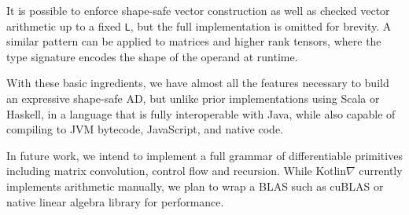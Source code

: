 \documentclass{article}
\newcommand{\squeezeup}{\vspace{-2.5mm}}
\begin{document}
    It is possible to enforce shape-safe vector construction as well as checked vector arithmetic up to a fixed \texttt{L}, but the full implementation is omitted for brevity. A similar pattern can be applied to matrices and higher rank tensors, where the type signature encodes the shape of the operand at runtime.

    With these basic ingredients, we have almost all the features necessary to build an expressive shape-safe AD, but unlike prior implementations using Scala or Haskell, in a language that is fully interoperable with Java, while also capable of compiling to JVM bytecode, JavaScript, and native code.

    In future work, we intend to implement a full grammar of differentiable primitives including matrix convolution, control flow and recursion. While Kotlin$\nabla$ currently implements arithmetic manually, we plan to wrap a BLAS such as cuBLAS or native linear algebra library for performance.

    \squeezeup
    
\end{document}
